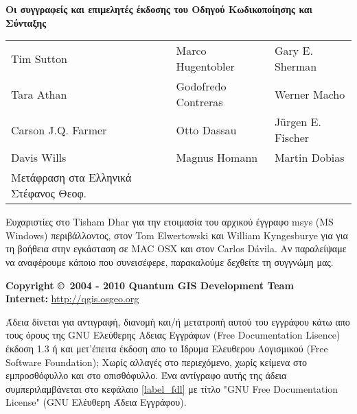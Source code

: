 \begin{flushleft}
\textbf{Οι συγγραφείς και επιμελητές έκδοσης του Οδηγού Κωδικοποίησης και Σύνταξης}
 
\begin{tabular}{p{5cm} p{5cm} p{5cm}}
Tim Sutton & Marco Hugentobler & Gary E. Sherman \\
Tara Athan & Godofredo Contreras & Werner Macho \\
Carson J.Q. Farmer & Otto Dassau & J\"urgen E. Fischer \\
Davis Wills & Magnus Homann & Martin Dobias \\ 

Μετάφραση στα Ελληνικά 
Στέφανος Θεοφ. 
\end{tabular}

Ευχαριστίες στο Tisham Dhar για την ετοιμασία του αρχικού έγγραφο msys (MS Windows) περιβάλλοντος, στον Tom Elwertowski και William Kyngesburye για για τη βοήθεια στην εγκάσταση σε MAC OSX και στον Carlos D\'{a}vila. Αν παραλείψαμε να αναφέρουμε κάποιο που συνεισέφερε, παρακαλούμε δεχθείτε τη συγγνώμη μας. 
\vspace{0.5cm}

\textbf{Copyright \copyright~2004 - 2010 Quantum GIS Development Team} \\
\textbf{Internet:} \url{http://qgis.osgeo.org}
\end{flushleft}

\newpage


Άδεια δίνεται για αντιγραφή, διανομή και/ή μετατροπή αυτού του εγγράφου κάτω απο τους όρους της GNU Ελεύθερης Αδειας Εγγράφων (Free Documentation Lisence) έκδοση 1.3 ή και μετ’έπειτα έκδοση απο το Ίδρυμα Ελευθερου Λογισμικού (Free Software Foundation); Χωρίς αλλαγές στο περιεχόμενο, χωρίς κείμενα στο εμπροσθόφυλλο και στο οπισθόφυλλο. Ένα αντίγραφο αυτής της άδεια συμπεριλαμβάνεται στο κεφάλαιο \ref{label_fdl} με τίτλο "GNU Free Documentation License" (GNU Ελέυθερη Άδεια Εγγράφου).

